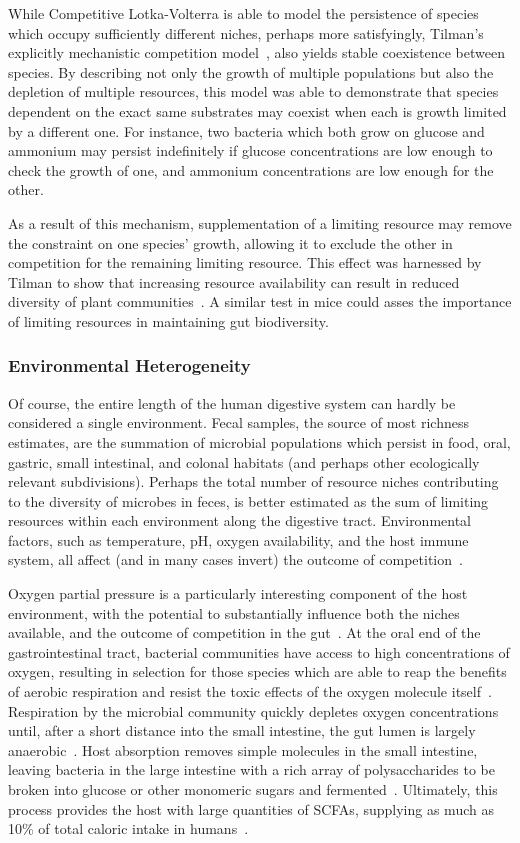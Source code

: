 \documentclass[12pt]{article}
\begin{document}
While Competitive Lotka-Volterra is able to model the
persistence of species which occupy sufficiently different
niches,
perhaps more satisfyingly,
Tilman's explicitly mechanistic competition
model~\citep{Tilman1977},
also yields stable coexistence between species.
By describing not only the growth of multiple populations
but also the depletion of multiple resources,
this model was able to demonstrate that
species dependent on the exact same substrates may coexist
when each is growth limited by a different one.
For instance, two bacteria which both grow on glucose and
ammonium may persist indefinitely if glucose concentrations are
low enough to check the growth of one, and ammonium
concentrations are low enough for the other.

As a result of this mechanism, supplementation of a
limiting resource may remove the constraint on one species'
growth, allowing it to exclude the other in competition for
the remaining limiting resource.
This effect was harnessed by Tilman to show that increasing
resource availability can result in reduced diversity of
plant communities~\citep{Harpole2007}.
A similar test in mice could asses the importance of limiting
resources in maintaining gut biodiversity.

\subsubsection{Environmental Heterogeneity}
Of course, the entire length of the human digestive system can
hardly be considered a single environment.
Fecal samples, the source of most richness estimates, are the
summation of microbial populations which persist in
food, oral, gastric, small intestinal, and colonal habitats
(and perhaps other ecologically relevant subdivisions).
Perhaps the total number of resource niches contributing
to the diversity of microbes in feces,
is better estimated as the sum of limiting resources
within each environment along the digestive tract.
Environmental factors, such as temperature, pH,
oxygen availability, and the host immune system,
all affect
(and in many cases invert)
the outcome of competition~\citep{TODO}.

Oxygen partial pressure is a particularly interesting
component of the host environment, with the potential
to substantially influence both the niches available,
and the outcome of competition in the gut~\citep{Espey2013}.
At the oral end of the gastrointestinal tract, bacterial
communities have access to high concentrations of oxygen,
resulting in selection for those species which are able to
reap the benefits of aerobic respiration
and resist the toxic effects of the oxygen molecule itself~\citep{TODO}.
Respiration by the microbial community quickly depletes
oxygen concentrations until,
after a short distance into the small intestine,
the gut lumen is largely anaerobic~\citep{TODO}.
Host absorption removes simple molecules in the small
intestine,
leaving bacteria in the large intestine with a
rich array of polysaccharides to be broken into glucose or
other monomeric sugars and fermented~\citep[reviewed in][]{Macfarlane2012}.
Ultimately, this process provides the host with large
quantities of \glspl*{SCFA},
supplying as much as 10\% of total caloric intake in
humans~\citep{McNeil1984}.
\end{document}
